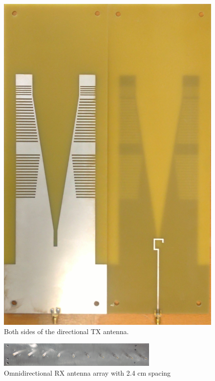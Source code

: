 \begin{figure}[H]
\begin{minipage}[H]{0.4\textwidth}
    \includegraphics[width=\textwidth]{pictures/Measurement/dirrecional_antenna.jpg}
    \caption{Both sides of the directional TX antenna.}
    \label{DirAnt}
  \end{minipage}
\end{figure}

\begin{figure}[H]
\centering
\includegraphics[width=0.7\textwidth]{pictures/Measurement/antenna_array.jpg}
    \caption{Omnidirectional RX antenna array with 2.4 cm spacing}
    \label{OmniDirAnt}
\end{figure}



